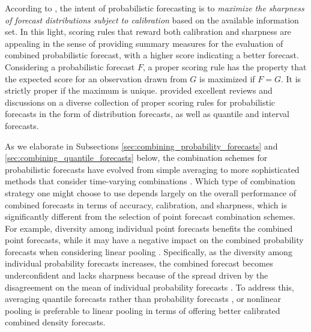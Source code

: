 \documentclass[11pt]{article}
\begin{document}
According to \cite{Gneiting2007-fr}, the intent of probabilistic forecasting is to \textit{maximize the sharpness of forecast distributions subject to calibration} based on the available information set. In this light, scoring rules that reward both calibration and sharpness are appealing in the sense of providing summary measures for the evaluation of combined probabilistic forecast, with a higher score indicating a better forecast. Considering a probabilistic forecast $F$, a proper scoring rule has the property that the expected score for an observation drawn from $G$ is maximized if $F=G$. It is strictly proper if the maximum is unique. \cite{Gneiting2007-ij} provided excellent reviews and discussions on a diverse collection of proper scoring rules for probabilistic forecasts in the form of distribution forecasts, as well as quantile and interval forecasts.

As we elaborate in Subsections \ref{sec:combining_probability_forecasts} and \ref{sec:combining_quantile_forecasts} below, the combination schemes for probabilistic forecasts have evolved from simple averaging \citep[e.g.,][]{OHagan2006-jk} to more sophisticated methods that consider time-varying combinations \citep[e.g.,][]{Billio2013-sg,McAlinn2019-kn}. Which type of combination strategy one might choose to use depends largely on the overall performance of combined forecasts in terms of accuracy, calibration, and sharpness, which is significantly different from the selection of point forecast combination schemes. For example, diversity among individual point forecasts benefits the combined point forecasts, while it may have a negative impact on the combined probability forecasts when considering linear pooling \citep[for a theoretical illustration and simulation study, see][]{Ranjan2010-jl}. Specifically, as the diversity among individual probability forecasts increases, the combined forecast becomes underconfident and lacks sharpness because of the spread driven by the disagreement on the mean of individual probability forecasts \citep{Wallis2005-yf,Lichtendahl2013-tk}. To address this, averaging quantile forecasts rather than probability forecasts \citep{Lichtendahl2013-rt}, or nonlinear pooling \citep{Ranjan2010-jl,Gneiting2013-hl} is preferable to linear pooling in terms of offering better calibrated combined density forecasts.
\end{document}
